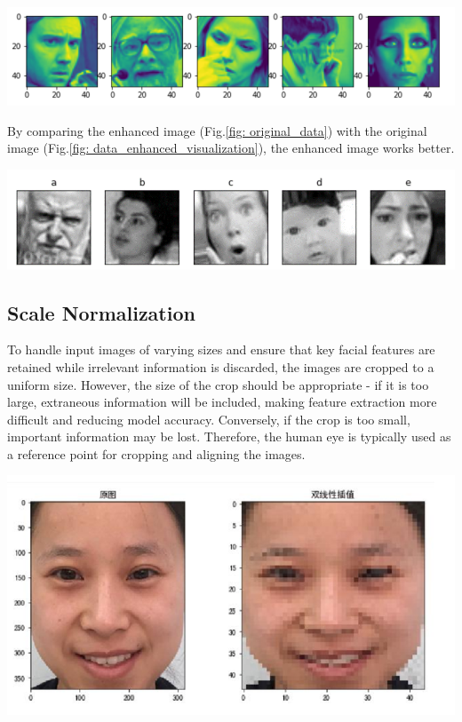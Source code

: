 \documentclass[a0,portrait]{a0poster}
\begin{document}
\begin{multicols}{2}
\begin{center}\vspace{1cm}
	\includegraphics[width=0.8\linewidth]{original_data}
\end{center}\vspace{1cm}


By comparing the enhanced image (Fig.\ref{fig: original_data}) with the original image (Fig.\ref{fig: data_enhanced_visualization}), the enhanced image works better.


\begin{center}\vspace{1cm}
	\includegraphics[width=0.8\linewidth]{data_enhanced_visualization}
\end{center}\vspace{1cm}


\subsection*{Scale Normalization}

\quad To handle input images of varying sizes and ensure that key facial features are retained while irrelevant information is discarded, the images are cropped to a uniform size. However, the size of the crop should be appropriate - if it is too large, extraneous information will be included, making feature extraction more difficult and reducing model accuracy. Conversely, if the crop is too small, important information may be lost. Therefore, the human eye is typically used as a reference point for cropping and aligning the images.

\begin{center}\vspace{1cm}
	\includegraphics[width=0.4\linewidth]{compared}
\end{center}\vspace{1cm}


\end{multicols}
\end{document}
